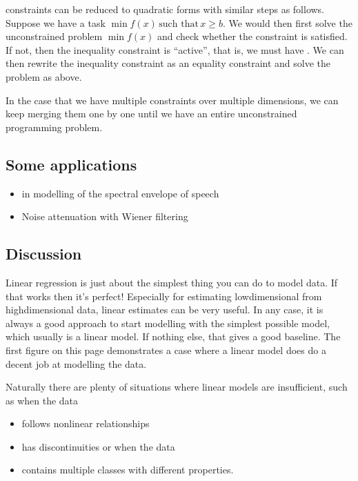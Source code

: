 \documentclass[letterpaper,10pt,english]{jupyterBook}
\begin{document}
\sphinxAtStartPar
{} constraints can be reduced to quadratic forms with similar
steps as follows. Suppose we have a task  \( \min f(x)\,\text{such
that}\,x \geq b. \) We would then first solve the unconstrained
problem \( \min f(x) \) and check whether the constraint is
satisfied. If not, then the inequality constraint is “active”, that is,
we must have . We can then rewrite the inequality constraint as an
equality constraint and solve the problem as above.

\sphinxAtStartPar
In the case that we have multiple constraints over multiple dimensions,
we can keep merging them one by one until we have an entire
unconstrained programming problem.

\sphinxAtStartPar
{}


\subsection{Some applications}
\label{\detokenize{Modelling/Linear_regression:some-applications}}\begin{itemize}
\item {} 
\sphinxAtStartPar
{} in modelling of the spectral
envelope of speech

\item {} 
\sphinxAtStartPar
Noise attenuation with Wiener filtering

\end{itemize}


\subsection{Discussion}
\label{\detokenize{Modelling/Linear_regression:discussion}}
\sphinxAtStartPar
Linear regression is just about the simplest thing you can do to model
data. If that works then it’s perfect! Especially for estimating
low\sphinxhyphen{}dimensional from high\sphinxhyphen{}dimensional data, linear estimates can be very
useful. In any case, it is always a good approach to start modelling
with the simplest possible model, which usually is a linear model. If
nothing else, that gives a good baseline. The first figure on this page
demonstrates a case where a linear model does do a decent job at
modelling the data.

\sphinxAtStartPar
Naturally there are plenty of situations where linear models are
insufficient, such as when the data
\begin{itemize}
\item {} 
\sphinxAtStartPar
follows non\sphinxhyphen{}linear relationships

\item {} 
\sphinxAtStartPar
has discontinuities or when the data

\item {} 
\sphinxAtStartPar
contains multiple classes with different properties.

\end{itemize}
\end{document}
